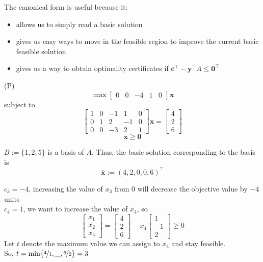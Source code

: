 The canonical form is useful because it:
\begin{itemize}
    \item allows us to simply read a basic solution
    \item gives us easy ways to move in the feasible region to improve the current basic
          feasible solution
    \item gives us a way to obtain optimality certificates if
          $\bm{c}^\top -\bm{y}^\top A\leqslant \bm{0}^\top $
\end{itemize}

\begin{exbox}
    \begin{example}
        (P)
        \[\max \begin{bmatrix}
                0 & 0 & -4 & 1 & 0
            \end{bmatrix}\bm{x}\]
        subject to
        \[
            \begin{bmatrix}
                1 & 0 & -1 & 1  & 0 \\
                0 & 1 & 2  & -1 & 0 \\
                0 & 0 & -3 & 2  & 1
            \end{bmatrix}\bm{x}
            =
            \begin{bmatrix}
                4 \\
                2 \\
                6
            \end{bmatrix} \]
        \[ \bm{x}\geqslant  \bm{0} \]

        $B:=\{1,2,5\}$ is a basis of $A$. Thus, the basic solution corresponding to the
        basis is
        \[\bm{\bar{x}}:=(4,2,0,0,6)^\top\]

        $c_3=-4$, increasing the value of $x_3$ from $0$ will decrease the objective value by $-4$ units\\
        $c_4=1$, we want to increase the value of $x_4$, so
        \[
            \begin{bmatrix}
                x_1 \\
                x_2 \\
                x_5
            \end{bmatrix}
            =
            \begin{bmatrix}
                4 \\
                2 \\
                6
            \end{bmatrix}
            -x_4
            \begin{bmatrix}
                1  \\
                -1 \\
                2
            \end{bmatrix}
            \geqslant  0
        \]
        Let $t$ denote the maximum value we can assign to $x_4$ and stay feasible.\\
        So,
        $t=\min\{\nicefrac{4}{1},\_,\nicefrac{6}{2}\}=3$
    \end{example}
\end{exbox}
